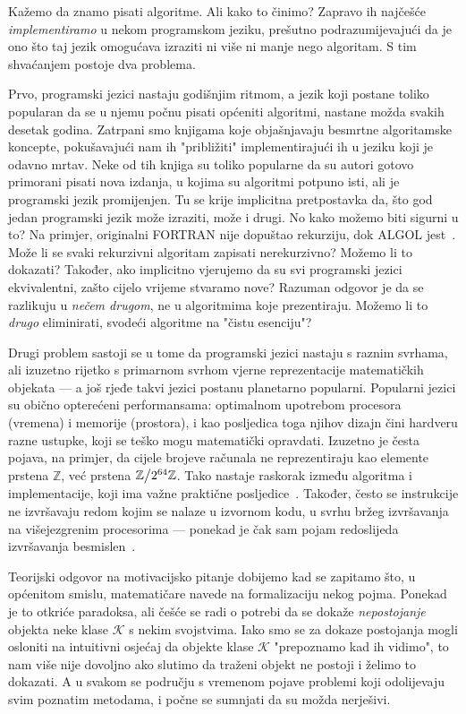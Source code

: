 Kažemo da znamo pisati algoritme. Ali kako to činimo? Zapravo ih najčešće \emph{implementiramo} u nekom programskom jeziku, prešutno podrazumijevajući da je ono što taj jezik omogućava izraziti ni više ni manje nego algoritam. S tim shvaćanjem postoje dva problema.

Prvo, programski jezici nastaju godišnjim ritmom, a jezik koji postane toliko popularan da se u njemu počnu pisati općeniti algoritmi, nastane možda svakih desetak godina. Zatrpani smo knjigama koje objašnjavaju besmrtne algoritamske koncepte, pokušavajući nam ih "približiti" implementirajući ih u jeziku koji je odavno mrtav\!. Neke od tih knjiga su toliko popularne da su autori gotovo primorani pisati nova izdanja, u kojima su algoritmi potpuno isti, ali je programski jezik promijenjen. Tu se krije implicitna pretpostavka da, što god jedan programski jezik može izraziti, može i drugi. No kako možemo biti sigurni u to? Na primjer, originalni FORTRAN nije dopuštao rekurziju, dok ALGOL jest~\cite{url:recursionAlgol}. Može li se svaki rekurzivni algoritam zapisati nerekurzivno? Možemo li to dokazati? Također, ako implicitno vjerujemo da su svi programski jezici ekvivalentni, zašto cijelo vrijeme stvaramo nove? Razuman odgovor je da se razlikuju u \emph{nečem drugom}, ne u algoritmima koje prezentiraju. Možemo li to \emph{drugo} eliminirati, svodeći algoritme na "čistu esenciju"?

Drugi problem sastoji se u tome da programski jezici nastaju s raznim svrhama, ali izuzetno rijetko s primarnom svrhom vjerne reprezentacije matematičkih objekata --- a još rjeđe takvi jezici postanu planetarno popularni. Popularni jezici su obično opterećeni performansama: optimalnom upotrebom procesora (vremena) i memorije (prostora), i kao posljedica toga njihov dizajn čini hardveru razne ustupke, koji se teško mogu matematički opravdati. Izuzetno je česta pojava, na primjer, da cijele brojeve računala ne reprezentiraju kao elemente prstena $\mathbb Z$, već prstena $\mathbb Z\big\slash2^{64}\mathbb Z$. Tako nastaje raskorak između algoritma i implementacije, koji ima važne praktične posljedice~\cite{url:wrongBinsearch}. Također, često se instrukcije ne izvršavaju redom kojim se nalaze u izvornom kodu, u svrhu bržeg izvršavanja na višejezgrenim procesorima --- ponekad je čak sam pojam redoslijeda izvršavanja besmislen~\cite[str.\ 10]{art:memorymodels}.

Teorijski odgovor na motivacijsko pitanje dobijemo kad se zapitamo što, u općenitom smislu, matematičare navede na formalizaciju nekog pojma. Ponekad je to otkriće paradoksa, ali češće se radi o potrebi da se dokaže \emph{nepostojanje} objekta neke klase $\mathcal K$ s nekim svojstvima. Iako smo se za dokaze postojanja mogli osloniti na intuitivni osjećaj da objekte klase $\mathcal K$ "prepoznamo kad ih vidimo", to nam više nije dovoljno ako slutimo da traženi objekt ne postoji i želimo to dokazati. A u svakom se području s vremenom pojave problemi koji odolijevaju svim poznatim metodama, i počne se sumnjati da su možda nerješivi.


